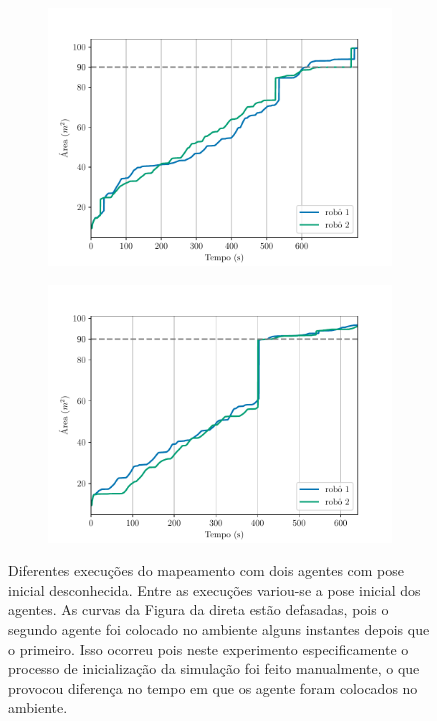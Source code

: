 \begin{figure}
  \centering
  \begin{subfigure}{0.49\textwidth}
    \includegraphics[width=\textwidth]{figs/area_coverage_two_robots-with-unknown-positions-01.pdf}
    \caption{}
    \label{fig:unk-pose-area-coverage-first}
  \end{subfigure}
  \hfill
  \begin{subfigure}{0.49\textwidth}
    \includegraphics[width=\textwidth]{figs/area_coverage_two_robots-with-unknown-positions-02.pdf}
    \caption{}
    \label{fig:}
  \end{subfigure}
  \caption[Comparação da evolução das áreas cobertas por dois agentes com pose inicial desconhecida]{Diferentes execuções do mapeamento com dois agentes com pose inicial desconhecida. Entre as execuções variou-se a pose inicial dos 
  agentes. As curvas da Figura da direta estão defasadas, pois o segundo 
  agente foi colocado no ambiente alguns instantes depois que o primeiro. Isso ocorreu pois neste experimento especificamente o processo de inicialização da simulação foi feito manualmente, o que provocou diferença no tempo em que os agente foram colocados no ambiente.}
  \label{fig:unknown-initial-pose-area-coverage}
\end{figure}

